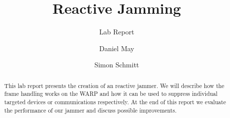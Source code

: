 \documentclass[sigconf]{acmart}
\begin{document}
\title{Reactive Jamming}

\subtitle{Lab Report}



\author{Daniel May}
\author{Simon Schmitt}

\renewcommand{\shortauthors}{Daniel May \& Simon Schmitt}


\begin{abstract}
%
%  
This lab report presents the creation of an reactive jammer. We will describe how the frame handling
works on the WARP and how it can be used to suppress individual targeted devices or communications
respectively. At the end of this report we evaluate the performance of our jammer and discuss
possible improvements.


\end{abstract}
\end{document}
